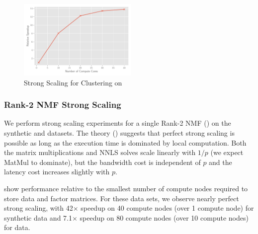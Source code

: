 \begin{figure}
\begin{center}
\includegraphics[height=1.5in, width=.7\columnwidth]{plots/dc_hierarchical_speedup.pdf}
\caption{Strong Scaling for Clustering on \hyper{}}
\label{fig:dcspeedup}
\end{center}
\end{figure}


\subsubsection{Rank-2 NMF Strong Scaling}

We perform strong scaling experiments for a single Rank-2 NMF () on the synthetic and \image{} datasets.
The theory () suggests that perfect strong scaling is possible as long as the execution time is dominated by local computation.
Both the matrix multiplications and NNLS solves scale linearly with $1/p$ (we expect MatMul to dominate), but the bandwidth cost is independent of $p$ and the latency cost increases slightly with $p$.

 show performance relative to the smallest number of compute nodes required to store data and factor matrices.
For these data sets, we observe nearly perfect strong scaling, with 42$\times$ speedup on 40 compute nodes (over 1 compute node) for synthetic data and 7.1$\times$ speedup on 80 compute nodes (over 10 compute nodes) for \image{} data.

